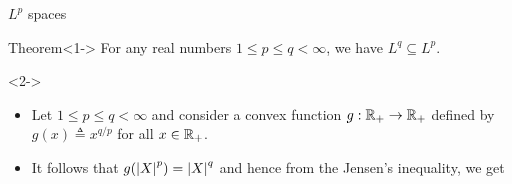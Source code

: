 \documentclass[12pt,aspectratio=169]{beamer}
\begin{document}
\begin{frame}{$L^p$ spaces}
\begin{block}{Theorem}<1-> For any real numbers $1 \le p \le q < \infty$, we have $L^q \subseteq L^p$.
\end{block}

\begin{Proof}<2->
\begin{itemize}
\item <2-> Let $1 \le p \le q < \infty$ and consider a convex function $g: \mathbb{R}_+ \to \mathbb{R}_+$ defined by $g(x) \triangleq x^{{q}/{p}}$ for all $x \in \mathbb{R}_+$. 
\item <3-> It follows that $g(\left\lvert X\right\rvert^p) = \left\lvert X\right\rvert^q$ and hence from the Jensen's inequality, we get
\end{itemize}
\end{Proof}
\end{frame}
\end{document}
